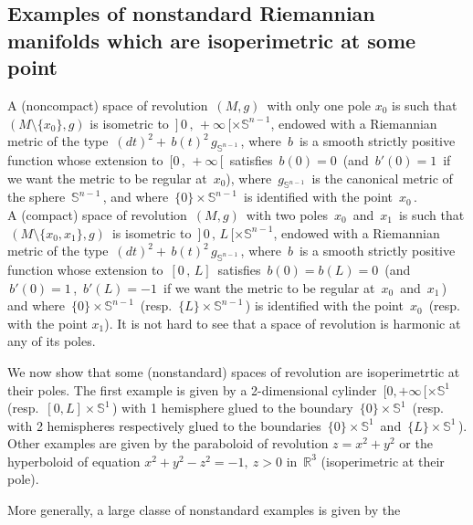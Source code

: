 \documentclass[11pt, reqno]{amsart}
\theoremstyle{plain}
\begin{document}
\subsection{Examples of nonstandard Riemannian manifolds which are isoperimetric at some point} \label{Example}
A (noncompact) space of revolution $\,(M,g)\,$ with
only one pole $x_0$ is
such that $ \left(M \setminus \{x_0\} , g\right)$ is isometric to 
$\,]\,0\,, \, + \infty \,[ \times \mathbb S^{n-1}$, endowed with a Riemannian metric
of the type $\, (dt)^2 + \,b(t)^2\, g_{\mathbb S^{n-1}}\,$, where $\,b\,$ is a smooth
strictly positive function whose extension to $\,[0\,, \, + \infty \,[ \,$ satisfies
$\,b(0) = 0\,$ (and $\,b'(0) = 1\,$ if we want the metric
to be regular at $\,x_0 $), where $\, g_{\mathbb S^{n-1}}\,$ is the canonical metric of the sphere
$\,\mathbb S^{n-1}\,$, and where $\, \{ 0\} \times \mathbb S^{n-1}\,$ is identified with the point
$\,x_0\,$.\\
A (compact) space of revolution $\,(M,g)\,$ with two poles $\,x_0\,$ and $\,x_1\,$ is
such that $\, \left(M \setminus \{x_0 , x_1\} , g\right)\,$ is isometric to 
$\,]\,0\,, \, L \,[ \times \mathbb S^{n-1}$, endowed with a Riemannian metric
of the type $\, (dt)^2 + \,b(t)^2\, g_{\mathbb S^{n-1}}\,$, where $\,b\,$ is a smooth
strictly positive function whose extension to $\, [0\,, \, L ]\,$ satisfies
$\,b(0) = b(L) = 0\,$ (and $\,b'(0) = 1\,$,
$\,b'(L) = -1\,$ if we want the metric to be regular at $\,x_0\,$ and $\,x_1\,$) and where 
$\, \{ 0\} \times \mathbb S^{n-1}\,$ (resp. $\, \{ L\} \times \mathbb S^{n-1}\,$) is 
identified with the point $\,x_0\,$ (resp.  with the point $x_1$). It is not hard to see that a  space of revolution is  harmonic at 
any of its poles.

We now show that some (nonstandard)  spaces of revolution are isoperimetrtic at their poles. 
The first  example is given by a 2-dimensional cylinder $\,[0 , +\infty \,[ \times \mathbb S^1\,$ 
(resp. $\,[0 , L] \times \mathbb S^1\,$) with 1 hemisphere glued to the boundary 
$\,\{0\} \times \mathbb S^1\,$ (resp. with 2 hemispheres respectively glued to the boundaries
$\,\{0\} \times \mathbb S^1\,$ and $\,\{L\} \times \mathbb S^1\,$). 
Other examples are given by  the paraboloid of revolution $z=x^2+y^2$
or the hyperboloid of equation $x^2 + y^2 - z^2 = -1,\  z>0$ in 
$\,\mathbb R^3$ (isoperimetric at their pole).

More generally, a large classe of nonstandard examples is given by the 
\end{document}
